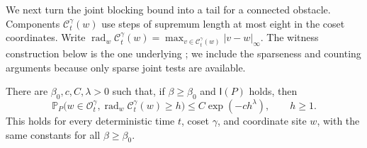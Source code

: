 We next turn the joint blocking bound into a tail for a connected
obstacle.  Components \(\mathcal C_t^\gamma(w)\) use steps of
supremum length at most eight in the coset coordinates.  Write
\(\operatorname{rad}_w\mathcal C_t^\gamma(w)
=\max_{v\in\mathcal C_t^\gamma(w)}|v-w|_\infty\).
The witness construction below is the one underlying
\cite[Lemma~5.2]{Ordering}; we include the sparseness and counting
arguments because only sparse joint tests are available.

\begin{lemma}\label{lem:component-tail}
There are \(\beta_0,c,C,\lambda>0\) such that, if
\(\beta\ge\beta_0\) and \(\mathsf I(P)\) holds, then
\begin{equation}\label{eq:component-tail}
 \mathbb P_P\bigl(w\in\mathcal O_t^\gamma,
   \operatorname{rad}_w\mathcal C_t^\gamma(w)\ge h\bigr)
 \le C\exp(-ch^\lambda),\qquad h\ge1.
\end{equation}
This holds for every deterministic time \(t\), coset \(\gamma\),
and coordinate site \(w\), with the same constants for all
\(\beta\ge\beta_0\).
\end{lemma}

